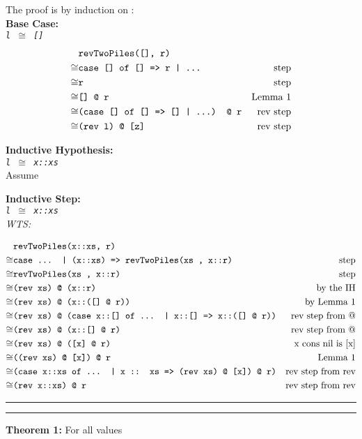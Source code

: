 \documentclass[11pt,letterpaper]{article}
\newcommand{\question}[2] {\vspace{.25in} \hrule\vspace{0.5em}
\noindent{\bf #1: #2} \vspace{0.5em}
\hrule \vspace{.10in}}
\begin{document}
The proof is by induction on :\\

\textbf{Base Case:}\\
\emph{\texttt{l $\cong$ []}}
\begin{align*}
      & \texttt{revTwoPiles([], r)} &\\
\cong & \texttt{case [] of [] => r | ...} & \text{step}\\ 
\cong & \texttt{r} & \text{step}\\
\cong & \texttt{[] @ r} & \text{Lemma 1}\\
\cong & \texttt{(case [] of [] => [] | ...) @ r} & \text{rev step} \\
\cong & \texttt{(rev l) @ [z]} & \text{rev step}
\end{align*}

\textbf{Inductive Hypothesis:}\\
\emph{\texttt{l $\cong$ x::xs}}\\
Assume 

\textbf{Inductive Step:}\\
\emph{\texttt{l $\cong$ x::xs}}\\
\emph{WTS: }

\begin{align*}
      & \texttt{revTwoPiles(x::xs, r)} & \\
\cong & \texttt{case ... | (x::xs) => revTwoPiles(xs , x::r)} & \text{step}\\
\cong & \texttt{revTwoPiles(xs , x::r)} & \text{step}\\
\cong & \texttt{(rev xs) @ (x::r)} & \text{by the IH}\\
\cong & \texttt{(rev xs) @ (x::([] @ r))} & \text{by Lemma 1}\\
\cong & \texttt{(rev xs) @ (case x::[] of ... | x::[] => x::([] @ r))} & \text{rev step from @}\\
\cong & \texttt{(rev xs) @ (x::[] @ r)} & \text{rev step from @}\\
\cong & \texttt{(rev xs) @ ([x] @ r)} & \text{ x cons nil is [x]}\\
\cong & \texttt{((rev xs) @ [x]) @ r} & \text{Lemma 1}\\
\cong & \texttt{(case x::xs of ... | x :: xs => (rev xs) @ [x]) @ r)} & \text{rev step from rev}\\
\cong & \texttt{(rev x::xs) @ r} & \text{rev step from rev}
\end{align*}

\question{4.2}{}
\textbf{Theorem 1:}
For all values 
\begin{center}\end{center}
\end{document}
